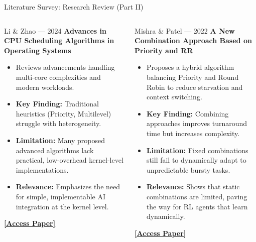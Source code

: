 \documentclass[aspectratio=169]{beamer}
\begin{document}
\begin{frame}{Literature Survey: Research Review (Part II)}
  \footnotesize
  \begin{columns}[T]
      \begin{block}{\color{white}Li \& Zhao — 2024}
        \textbf{Advances in CPU Scheduling Algorithms in Operating Systems}
        \begin{itemize}\scriptsize\itemsep3pt
          \item Reviews advancements handling multi-core complexities and modern workloads.
          \item \textbf{Key Finding:} Traditional heuristics (Priority, Multilevel) struggle with heterogeneity.
          \item \textbf{Limitation:} Many proposed advanced algorithms lack practical, low-overhead kernel-level implementations.
          \item \textbf{Relevance:} Emphasizes the need for simple, implementable AI integration at the kernel level.
        \end{itemize}
        \href{https://www.researchgate.net/publication/387444718}{\textcolor{primary}{\textbf{[Access Paper]}}}
      \end{block}
      \begin{block}{\color{white}Mishra \& Patel — 2022}
        \textbf{A New Combination Approach Based on Priority and RR}
        \begin{itemize}\scriptsize\itemsep3pt
          \item Proposes a hybrid algorithm balancing Priority and Round Robin to reduce starvation and context switching.
          \item \textbf{Key Finding:} Combining approaches improves turnaround time but increases complexity.
          \item \textbf{Limitation:} Fixed combinations still fail to dynamically adapt to unpredictable bursty tasks.
          \item \textbf{Relevance:} Shows that static combinations are limited, paving the way for RL agents that learn dynamically.
        \end{itemize}
        \href{https://thesai.org/Downloads/Volume13No4/Paper_63 A_New_Combination_Approach_to_CPU_Scheduling.pdf}{\textcolor{primary}{\textbf{[Access Paper]}}}
      \end{block}
  \end{columns}
\end{frame}
\end{document}
